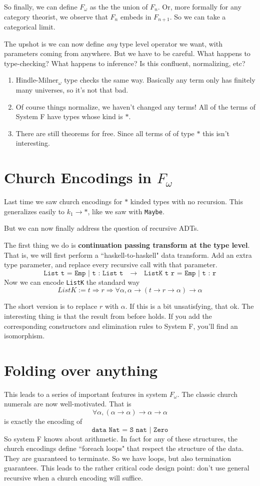 \documentclass[12pt]{article}
\newcommand{\hask}{\texttt}
\begin{document}
So finally, we can define $F_\omega$ as the the union of $F_n$. 
Or, more formally for any category theorist, we observe that $F_n$ embeds in $F_{n+1}$.
So we can take a categorical limit.

The upshot is we can now define \textit{any} type level operator we want, with parameters coming from anywhere. But we have to be careful. What happens to type-checking? What happens to inference? Is this confluent, normalizing, etc?
\begin{enumerate}
    \item Hindle-Milner$_\omega$ type checks the same way. Basically any term only has finitely many universes, so it's not that bad.
    \item Of course things normalize, we haven't changed any terms! All of the terms of System F have types whose kind is $*$.
    \item There are still theorems for free. Since all terms of of type $*$ this isn't interesting.
\end{enumerate}

\section{Church Encodings in $F_\omega$}
Last time we saw church encodings for $*$ kinded types with no recursion. 
This generalizes easily to $k_1 \rightarrow *$, like we saw with \hask{Maybe}.

But we can now finally address the question of recursive ADTs.

The first thing we do is \textbf{continuation passing transform at the type level}.
That is, we will first perform a ``haskell-to-haskell" data transform.
Add an extra type parameter, and replace every recursive call with that parameter.
\[
 \hask{List t = Emp | t : List t} \quad\longrightarrow\quad \hask{ListK t r = Emp | t : r}
\]
Now we can encode \hask{ListK} the standard way 
\[
  ListK := t \Rightarrow r \Rightarrow \forall \alpha, \alpha \rightarrow (t \rightarrow r \rightarrow \alpha) \rightarrow \alpha
\]

The short version is to replace $r$ with $\alpha$.
If this is a bit unsatisfying, that ok.
The interesting thing is that the result from before holds.  
If you add the corresponding constructors and elimination rules to System F, you'll find an isomorphism.

\section{Folding over anything}
This leads to a series of important features in system $F_\omega$.
The classic church numerals are now well-motivated.
That is 
\[
  \forall \alpha, (\alpha \rightarrow \alpha) \rightarrow \alpha \rightarrow \alpha
\]
is exactly the encoding of 
\[
\hask{data Nat = S nat | Zero}
\]
So system F knows about arithmetic.
In fact for any of these structures, the church encodings define ``foreach loops" that respect the structure of the data.
They are guaranteed to terminate. 
So we have loops, but also termination guarantees.
This leads to the rather critical code design point: don't use general recursive when a church encoding will suffice. 
\end{document}
